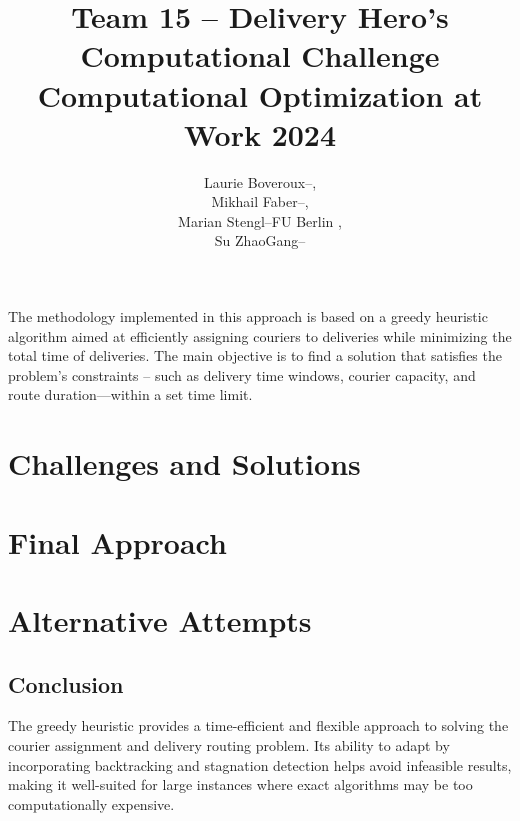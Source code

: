 \documentclass[a4paper]{article}
\title{Team 15 -- Delivery Hero's Computational Challenge \\[0.75em] \Large Computational Optimization at Work 2024}
\author{\begin{tabular}{lll}
        Laurie Boveroux & -- &  ,\tabularnewline%
        Mikhail Faber   & -- &  ,\tabularnewline%
        Marian Stengl   & -- & FU Berlin ,\tabularnewline
        Su ZhaoGang     & -- &  \tabularnewline%
\end{tabular}}
\newcommand\path{.}
\begin{document}
%
\maketitle%
The methodology implemented in this approach is based on a greedy heuristic algorithm aimed at efficiently assigning couriers to deliveries while minimizing the total time of deliveries. The main objective is to find a solution that satisfies the problem's constraints -- such as delivery time windows, courier capacity, and route duration—within a set time limit.
\section{Challenges and Solutions}%
%
\section{Final Approach}%
%
\section{Alternative Attempts}%
%
\subsection{Conclusion}
The greedy heuristic provides a time-efficient and flexible approach to solving the courier assignment and delivery routing problem. Its ability to adapt by incorporating backtracking and stagnation detection helps avoid infeasible results, making it well-suited for large instances where exact algorithms may be too computationally expensive.
\end{document}
